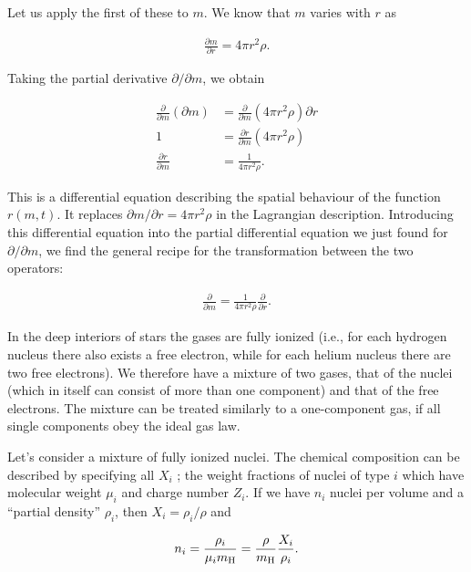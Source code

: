 \documentclass[a4paper,10pt]{article}
\begin{document}
{\noindent}Let us apply the first of these to $m$. We know that $m$ varies with $r$ as

\begin{align*}
    \frac{\partial m}{\partial r} = 4\pi r^2 \rho.
\end{align*}

{\noindent}Taking the partial derivative $\partial/\partial m$, we obtain

\begin{align*}
    \frac{\partial}{\partial m} \left(\partial m\right) &= \frac{\partial}{\partial m} \left(4\pi r^2 \rho\right) \partial r \\
    1& = \frac{\partial r}{\partial m} \left(4\pi r^2 \rho\right) \\
    \frac{\partial r}{\partial m} &= \frac{1}{4\pi r^2 \rho}.
\end{align*}

{\noindent}This is a differential equation describing the spatial behaviour of the function $r(m,t)$. It replaces $\partial m/\partial r=4\pi r^2\rho$ in the Lagrangian description. Introducing this differential equation into the partial differential equation we just found for $\partial/\partial m$, we find the general recipe for the transformation between the two operators:

\begin{align*}
    \frac{\partial}{\partial m} = \frac{1}{4\pi r^2\rho} \frac{\partial}{\partial r}.
\end{align*}

{\noindent}In the deep interiors of stars the gases are fully ionized (i.e., for each hydrogen nucleus there also exists a free electron, while for each helium nucleus there are two free electrons). We therefore have a mixture of two gases, that of the nuclei (which in itself can consist of more than one component) and that of the free electrons. The mixture can be treated similarly to a one-component gas, if all single components obey the ideal gas law.

{\noindent}Let's consider a mixture of fully ionized nuclei. The chemical composition can be described by specifying all $X_i$ ; the weight fractions of nuclei of type $i$ which have molecular weight $\mu_i$ and charge number $Z_i$. If we have $n_i$ nuclei per volume and a ``partial density'' $\rho_i$, then $X_i=\rho_i/\rho$ and

\begin{align*}
    n_i = \frac{\rho_i}{\mu_im_{\rm H}} = \frac{\rho}{m_{\rm H}} \frac{X_i}{\rho_i}.
\end{align*}
\end{document}
